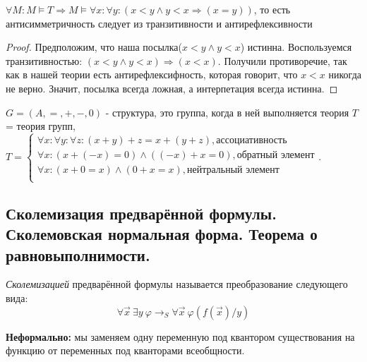 \documentclass[a4paper, fleqn]{article}
\begin{document}
        \begin{proposition}
            $\forall M : M \vDash T \Rightarrow M \vDash  \forall x : \forall y : (x < y \wedge y < x \Rightarrow (x = y))$, то есть 
            антисимметричность следует из транзитивности и антирефлексивности
     
        \end{proposition}
        \begin{proof}
            Предположим, что наша посылка($x < y \wedge y < x$) истинна. Воспользуемся 
            транзитивностью: $(x < y \wedge y < x) \Rightarrow (x < x)$. Получили 
            противоречие, так как в нашей теории есть антирефлексифность, которая говорит, что 
            $x < x$ никогда не верно. Значит, посылка всегда ложная, а интерпетация 
            всегда истинна.
        \end{proof}
        \begin{example}
            $G = (A, =, +, -, 0)$ - структура, это группа, когда в ней 
            выполняется теория $T$ = теория групп,
            $T = 
            \begin{cases}
                \forall x : \forall y : \forall z : (x + y) + z = x + (y + z), \text{ассоциативность} \\
                \forall x : (x + (-x) = 0) \wedge ((-x) + x = 0), \text{обратный элемент} \\
                \forall x : (x + 0 = x) \wedge (0 + x = x), \text{нейтральный элемент} \\
            
            \end{cases}.$    
               
        \end{example}
        
    \subsection{Сколемизация предварённой формулы. Сколемовская нормальная форма. Теорема о равновыполнимости.}

    \begin{definition}
        \textit{Сколемизацией} предварённой формулы называется преобразование следующего вида:
        \[
        \forall \overrightarrow{x} \: \exists y \: \varphi \rightarrow_S \forall \overrightarrow{x} \: \varphi\left(f(\overrightarrow{x})/y\right)
        \]
    \end{definition}
    \vspace{-\baselineskip}
    \textbf{Неформально:} мы заменяем одну переменную под квантором существования на функцию от переменных под кванторами всеобщности. \\
\end{document}
